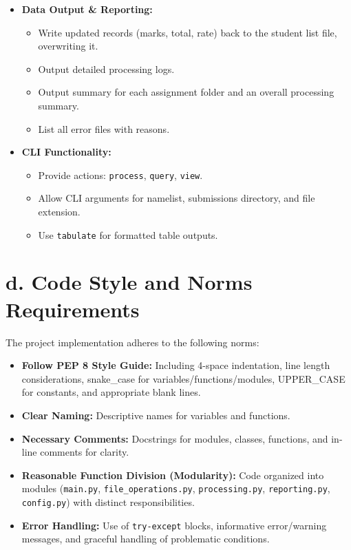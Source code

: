 \documentclass[11pt, a4paper]{article}
\begin{document}
\begin{itemize}[leftmargin=*]
    \item \textbf{Data Output \& Reporting:}
    \begin{itemize}
        \item Write updated records (marks, total, rate) back to the student list file, overwriting it.
        \item Output detailed processing logs.
        \item Output summary for each assignment folder and an overall processing summary.
        \item List all error files with reasons.
    \end{itemize}

    \item \textbf{CLI Functionality:}
    \begin{itemize}
        \item Provide actions: \texttt{process}, \texttt{query}, \texttt{view}.
        \item Allow CLI arguments for namelist, submissions directory, and file extension.
        \item Use \texttt{tabulate} for formatted table outputs.
    \end{itemize}
\end{itemize}

\section*{d. Code Style and Norms Requirements}
The project implementation adheres to the following norms:
\begin{itemize}[leftmargin=*]
    \item \textbf{Follow PEP 8 Style Guide:} Including 4-space indentation, line length considerations, snake\_case for variables/functions/modules, UPPER\_CASE for constants, and appropriate blank lines.
    \item \textbf{Clear Naming:} Descriptive names for variables and functions.
    \item \textbf{Necessary Comments:} Docstrings for modules, classes, functions, and in-line comments for clarity.
    \item \textbf{Reasonable Function Division (Modularity):} Code organized into modules (\texttt{main.py}, \texttt{file\_operations.py}, \texttt{processing.py}, \texttt{reporting.py}, \texttt{config.py}) with distinct responsibilities.
    \item \textbf{Error Handling:} Use of \texttt{try-except} blocks, informative error/warning messages, and graceful handling of problematic conditions.
\end{itemize}
\end{document}
